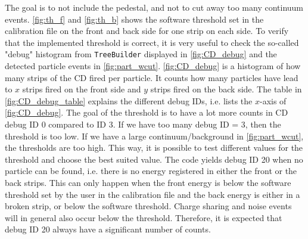 \documentclass[twoside,english]{uiofysmaster/uiofysmaster}
\let\orgautoref\autoref
\renewcommand{\autoref}
        {%
		 \def\sectionautorefname{Section}%
		 \def\subsectionautorefname{Section}%
		 \def\subsubsectionautorefname{Section}%
		 \def\chapterautorefname{Chapter}%
          \orgautoref}
\begin{document}
The goal is to not include the pedestal, and not to cut away too many continuum events.
\autoref{fig:th_f} and \autoref{fig:th_b} shows the software threshold set in the calibration file on the front and back side for one strip on each side.
To verify that the implemented threshold is correct, it is very useful to check the so-called "debug" histogram from \texttt{TreeBuilder} displayed in \autoref{fig:CD_debug} and the detected particle events in \autoref{fig:part_wcut}.
\autoref{fig:CD_debug} is a histogram of how many strips of the CD fired per particle.
It counts how many particles have lead to $x$ strips fired on the front side and $y$ strips fired on the back side. 
The table in \autoref{fig:CD_debug_table} explains the different debug IDs, i.e. lists the $x$-axis of \autoref{fig:CD_debug}. 
The goal of the threshold is to have a lot more counts in CD debug ID 0 compared to ID 3.
If we have too many debug ID = 3, then the threshold is too low. 
If we have a large continuum/background in \autoref{fig:part_wcut}, the thresholds are too high. 
This way, it is possible to test different values for the threshold and choose the best suited value.
The code yields debug ID 20 when no particle can be found, i.e. there is no energy registered in either the front or the back strips. 
This can only happen when the front energy is below the software threshold set by the user in the calibration file and the back energy is either in a broken strip, or below the software threshold. 
Charge sharing and noise events will in general also occur below the threshold.
Therefore, it is expected that debug ID 20 always have a significant number of counts.
\end{document}
